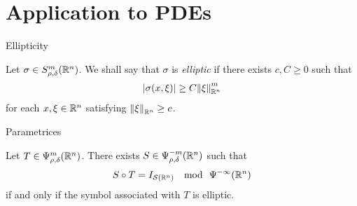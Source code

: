 \documentclass{beamer}
\begin{document}
\section{Application to PDEs}

\begin{frame}
    {Ellipticity}

    \begin{definition}
        [Ellipticity]

        Let $\sigma \in \SymbolClass m {\rho, \delta}$.
        We shall say that $\sigma$ is \emph{elliptic} if there exists $c, C \geq 0$ such that
        \begin{align*}
            \abs {\sigma(x, \xi)}
            \geq C \norm [\R^n] \xi^m
        \end{align*}
        for each $x, \xi \in \R^n$ satisfying $\norm [\R^n] \xi \geq c$.
    \end{definition}
\end{frame}

\begin{frame}
    {Parametrices}

    \begin{theorem}

        Let $T \in \OperatorClass m {\rho, \delta}$.
        There exists $S \in \OperatorClass {-m} {\rho, \delta}$ such that
        \begin{align*}
            S \circ T = \Id {\Schwartz \Group}
            \quad
            \text{mod } \
            \SmoothingOperators
        \end{align*}
        if and only if the symbol associated with $T$ is elliptic.
    \end{theorem}
\end{frame}
\end{document}
